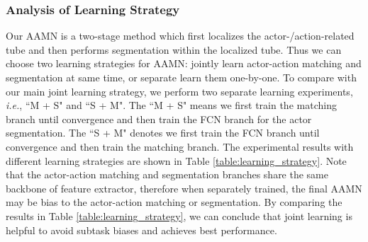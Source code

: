 \documentclass[journal]{IEEEtran}
\begin{document}
\subsubsection{Analysis of Learning Strategy}
Our AAMN is a two-stage method which first localizes the actor-/action-related tube and then performs segmentation within the localized tube. Thus we can choose two learning strategies for AAMN: jointly learn actor-action matching and segmentation at same time, or separate learn them one-by-one. To compare with our main joint learning strategy, we perform two separate learning experiments, \emph{i.e.}, ``M + S" and ``S + M". The ``M + S" means we first train the matching branch until convergence and then train the FCN branch for the actor segmentation. The ``S + M" denotes we first train the FCN branch until convergence and then train the matching branch. The experimental results with different learning strategies are shown in Table \ref{table:learning_strategy}. Note that the actor-action matching and segmentation branches share the same backbone of feature extractor, therefore when separately trained, the final AAMN may be bias to the actor-action matching or segmentation. By comparing the results in Table \ref{table:learning_strategy}, we can conclude that joint learning is helpful to avoid subtask biases and achieves best performance.

\begin{table}[!bt]
\begin{threeparttable}
\caption{The analysis of different training strategies}
\label{table:learning_strategy}
\centering
{}
\end{threeparttable}
\vspace{-0.3cm}
\end{table}
\end{document}
